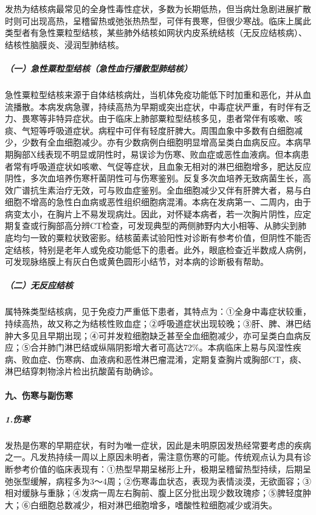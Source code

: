 发热为结核病最常见的全身性毒性症状，多数为长期低热，但当病灶急剧进展扩散时则可出现高热，呈稽留热或弛张热热型，可伴有畏寒，但很少寒战。临床上属此类型者有急性粟粒型结核，某些肺外结核如网状内皮系统结核（无反应结核病）、结核性脑膜炎、浸润型肺结核。

\subparagraph{（一）急性粟粒型结核（急性血行播散型肺结核）}

急性粟粒型结核来源于自体结核病灶，当机体免疫功能低下时加重和恶化，并从血流播散。本病发病急骤，持续高热为早期或突出症状，中毒症状严重，有时伴有乏力、畏寒等非特异症状。由于临床上肺部粟粒型结核多见，患者常伴有咳嗽、咳痰、气短等呼吸道症状。病程中可伴有轻度肝脾大。周围血象中多数有白细胞减少，少数有全血细胞减少。亦有少数病例白细胞明显增高呈类白血病反应。本病早期胸部X线表现不明显或阴性时，易误诊为伤寒、败血症或恶性血液病。但本病患者常有呼吸道症状如咳嗽、气促等症状，且血象无相对的淋巴细胞增多，肥达反应阴性，多次血培养伤寒杆菌阴性可与伤寒鉴别。反复多次血培养无致病菌生长，高效广谱抗生素治疗无效，可与败血症鉴别。全血细胞减少又伴有肝脾大者，易与白细胞不增高的急性白血病或恶性组织细胞病混淆。本病在发病第一、二周内，由于病变太小，在胸片上不易发现病灶。因此，对怀疑本病者，若一次胸片阴性，应定期复查或行胸部高分辨CT检查，可发现典型的两侧肺野内大小相等、从肺尖到肺底均匀一致的粟粒状致密影。结核菌素试验阳性对诊断有参考价值，但阴性不能否定结核，特别是老年人或免疫功能低下的患者。此外，眼底检查近半数成人病例，可发现脉络膜上有灰白色或黄色圆形小结节，对本病的诊断极有帮助。

\subparagraph{（二）无反应结核}

属特殊类型结核病，见于免疫力严重低下患者，其特点为：①全身中毒症状较重，持续高热，故又称之为结核性败血症；②呼吸道症状出现较晚；③肝、脾、淋巴结肿大多见且早期出现；④可并发粒细胞缺乏甚至全血细胞减少，亦可呈类白血病反应；⑤合并肺门淋巴结或纵隔阴影增大者可高达72\%。本病临床上易与风湿性疾病、败血症、伤寒病、血液病和恶性淋巴瘤混淆，定期复查胸片或胸部CT，痰、淋巴结穿刺物涂片检出抗酸菌有助确诊。

\paragraph{九、伤寒与副伤寒}

\subparagraph{1.伤寒}

发热是伤寒的早期症状，有时为唯一症状，因此是未明原因发热经常要考虑的疾病之一。凡发热持续一周以上原因未明者，需注意伤寒的可能。传统观点认为具有诊断参考价值的临床表现有：①热型早期呈梯形上升，极期呈稽留热型持续，后期呈弛张型缓解，病程多为3～4周；②伤寒毒血状态，表现为表情淡漠，无欲面容；③相对缓脉与重脉；④发病一周左右胸前、腹上区分批出现少数玫瑰疹；⑤脾轻度肿大；⑥白细胞总数减少，相对淋巴细胞增多，嗜酸性粒细胞减少或消失。


